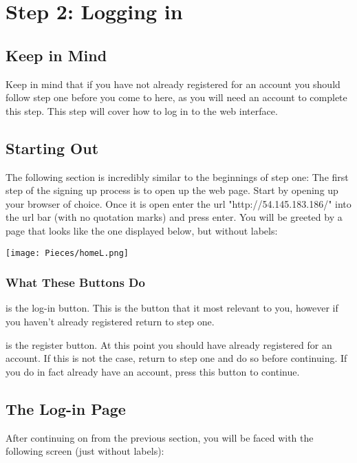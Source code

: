 \chapter{Step 2: Logging in}

\setlength{\parindent}{0cm}

\section{Keep in Mind}
Keep in mind that if you have not already registered for an account you should follow step one before you come to here, as you will need an account to complete this step. This step will cover how to log in to the web interface.

\section{Starting Out}
The following section is incredibly similar to the beginnings of step one:
The first step of the signing up process is to open up the web page. Start by opening up your browser of choice. Once it is open enter the url "http://54.145.183.186/" into the url bar (with no quotation marks) and press enter. You will be greeted by a page that looks like the one displayed below, but without labels:

\begin{center}
    \texttt{[image: Pieces/homeL.png]}
\end{center}

\subsection{What These Buttons Do}
\begin{enumerate}[{[1]}]
\item is the log-in button. This is the button that it most relevant to you, however if you haven't already registered return to step one.
\item is the register button. At this point you should have already registered for an account. If this is not the case, return to step one and do so before continuing. If you do in fact already have an account, press this button to continue.
\end{enumerate}

\section{The Log-in Page}
After continuing on from the previous section, you will be faced with the following screen (just without labels):

